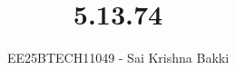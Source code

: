\documentclass[journal]{IEEEtran}
\begin{document}

\vspace{3cm}

\title{5.13.74}
\author{EE25BTECH11049 - Sai Krishna Bakki}
\maketitle
\vspace{-3em}
{\let\newpage\relax\maketitle}

\renewcommand{\thefigure}{\theenumi}
\renewcommand{\thetable}{\theenumi}
\setlength{\intextsep}{10pt} %


\renewcommand{\thetable}{\theenumi}
\end{document}
